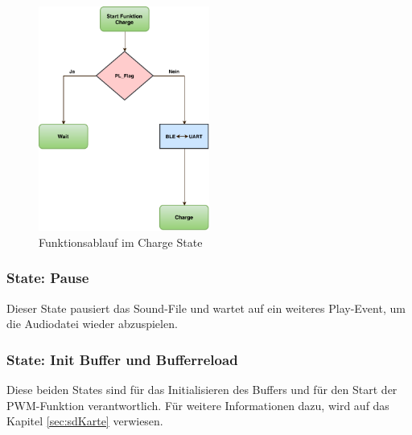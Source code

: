 \begin{figure}[htbp!!!!]
	\centering
	\includegraphics[width=0.5\textwidth]{Data/Charge_picture.pdf}
	\caption[Statemachine: Charge]{Funktionsablauf im Charge State}
	\label{fig:chargeState}
\end{figure} 

\subsubsection*{State: Pause}

Dieser State pausiert das Sound-File und wartet auf ein weiteres Play-Event, um die Audiodatei wieder abzuspielen.

\subsubsection*{State: Init Buffer und Bufferreload}
Diese beiden States sind für das Initialisieren des Buffers und für den Start der PWM-Funktion verantwortlich. Für weitere Informationen dazu, wird auf das Kapitel \ref{sec:sdKarte} verwiesen.